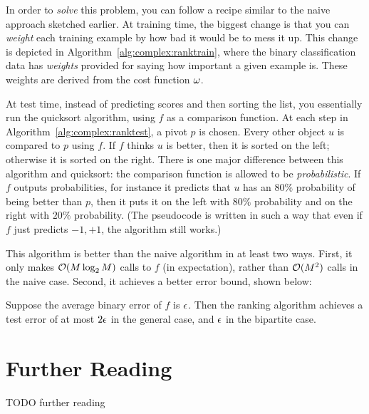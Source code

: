 In order to \emph{solve} this problem, you can follow a recipe similar
to the naive approach sketched earlier.  At training time, the biggest
change is that you can \emph{weight} each training example by how bad
it would be to mess it up.  This change is depicted in
Algorithm~\ref{alg:complex:ranktrain}, where the binary classification
data has \emph{weights}  provided for saying how important a
given example is.  These weights are derived from the cost function
$\omega$.

At test time, instead of predicting scores and then sorting the list,
you essentially run the quicksort algorithm, using $f$ as a comparison
function.  At each step in Algorithm~\ref{alg:complex:ranktest}, a
pivot $p$ is chosen.  Every other object $u$ is compared to $p$ using
$f$.  If $f$ thinks $u$ is better, then it is sorted on the left;
otherwise it is sorted on the right.  There is one major difference
between this algorithm and quicksort: the comparison function is
allowed to be \emph{probabilistic}.  If $f$ outputs probabilities, for
instance it predicts that $u$ has an $80\%$ probability of being
better than $p$, then it puts it on the left with $80\%$ probability
and on the right with $20\%$ probability.  (The pseudocode is written
in such a way that even if $f$ just predicts $-1,+1$, the algorithm
still works.)

This algorithm is better than the naive algorithm in at least two
ways.  First, it only makes $\mathcal{O}(M\log_2 M)$ calls to $f$ (in
expectation), rather than $\mathcal{O}(M^2)$ calls in the naive case.  Second,
it achieves a better error bound, shown below:

\begin{theorem} \label{thm:complex:rank} Suppose the
  average binary error of $f$ is $\epsilon$.  Then the ranking algorithm
  achieves a test error of at most $2\epsilon$ in the general case, and
  $\epsilon$ in the bipartite case.
\end{theorem}

\section{Further Reading}

TODO further reading





